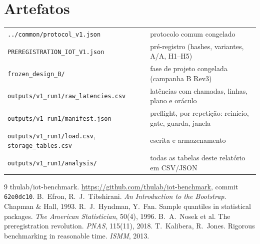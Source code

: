 \documentclass[11pt,a4paper]{article}
\begin{document}
\section{Artefatos}
\begin{longtable}{@{}p{6cm}p{8.6cm}@{}}\toprule
\texttt{../common/protocol\_v1.json} & protocolo comum congelado\\
\texttt{PREREGISTRATION\_IOT\_V1.json} & pré-registro (hashes, variantes, A/A, H1--H5)\\
\texttt{frozen\_design\_B/} & fase de projeto congelada (campanha B Rev3)\\
\texttt{outputs/v1\_run1/raw\_latencies.csv} & \envrawrows{} latências com chamadas, linhas, plano e oráculo\\
\texttt{outputs/v1\_run1/manifest.json} & preflight, por repetição: reinício, gate, guarda, janela\\
\texttt{outputs/v1\_run1/load.csv}, \texttt{storage\_tables.csv} & escrita e armazenamento\\
\texttt{outputs/v1\_run1/analysis/} & todas as tabelas deste relatório em CSV/JSON\\\bottomrule
\end{longtable}

\begin{thebibliography}{9}\small
{} thulab/iot-benchmark. \url{https://github.com/thulab/iot-benchmark}, commit \texttt{62e0dc10}.
 B.~Efron, R.~J.~Tibshirani. \emph{An Introduction to the Bootstrap}. Chapman \& Hall, 1993.
 R.~J.~Hyndman, Y.~Fan. Sample quantiles in statistical packages. \emph{The American Statistician}, 50(4), 1996.
 B.~A.~Nosek et al. The preregistration revolution. \emph{PNAS}, 115(11), 2018.
 T.~Kalibera, R.~Jones. Rigorous benchmarking in reasonable time. \emph{ISMM}, 2013.
\end{thebibliography}
\end{document}
